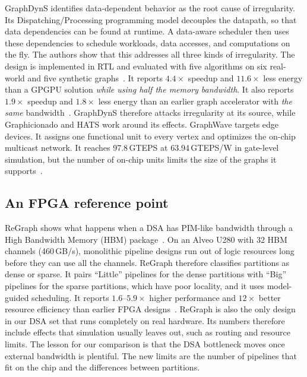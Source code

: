 \documentclass[journal,onecolumn]{IEEEtran}
\begin{document}
GraphDynS identifies data-dependent behavior as the root cause of irregularity. Its Dispatching/Processing programming model decouples the datapath, so that data dependencies can be found at runtime. A data-aware scheduler then uses these dependencies to schedule workloads, data accesses, and computations on the fly. The authors show that this addresses all three kinds of irregularity. The design is implemented in RTL and evaluated with five algorithms on six real-world and five synthetic graphs~\cite{yan2019graphdyns}. It reports $4.4\times$ speedup and $11.6\times$ less energy than a GPGPU solution \emph{while using half the memory bandwidth}. It also reports $1.9\times$ speedup and $1.8\times$ less energy than an earlier graph accelerator with \emph{the same} bandwidth~\cite{yan2019graphdyns}. GraphDynS therefore attacks irregularity at its source, while Graphicionado and HATS work around its effects. GraphWave targets edge devices. It assigns one functional unit to every vertex and optimizes the on-chip multicast network. It reaches 97.8\,GTEPS at 63.94\,GTEPS/W in gate-level simulation, but the number of on-chip units limits the size of the graphs it supports~\cite{lee2022graphwave}.

\subsection{An FPGA reference point}
ReGraph shows what happens when a DSA has PIM-like bandwidth through a High Bandwidth Memory (HBM) package~\cite{chen2022regraph}. On an Alveo U280 with 32 HBM channels (460\,GB/s), monolithic pipeline designs run out of logic resources long before they can use all the channels. ReGraph therefore classifies partitions as dense or sparse. It pairs ``Little'' pipelines for the dense partitions with ``Big'' pipelines for the sparse partitions, which have poor locality, and it uses model-guided scheduling. It reports $1.6$--$5.9\times$ higher performance and $12\times$ better resource efficiency than earlier FPGA designs~\cite{chen2022regraph}. ReGraph is also the only design in our DSA set that runs completely on real hardware. Its numbers therefore include effects that simulation usually leaves out, such as routing and resource limits. The lesson for our comparison is that the DSA bottleneck moves once external bandwidth is plentiful. The new limits are the number of pipelines that fit on the chip and the differences between partitions.
\end{document}
